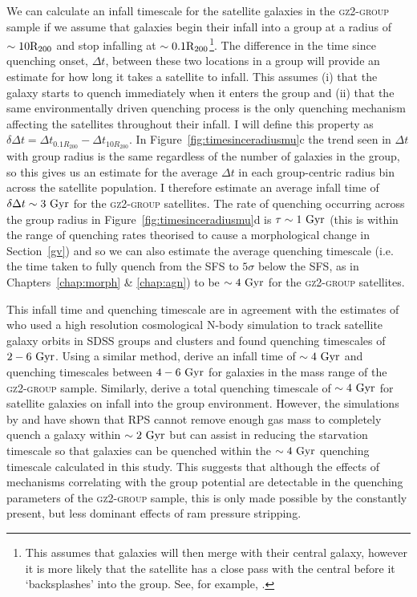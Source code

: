 We can calculate an infall timescale for the satellite galaxies in the \textsc{gz2-group} sample if we assume that galaxies begin their infall into a group at a radius of $\sim10\rm{R}_{200}$ and stop infalling at $\sim0.1\rm{R}_{200}$\footnote{This assumes that galaxies will then merge with their central galaxy, however it is more likely that the satellite has a close pass with the central before it `backsplashes' into the group. See, for example, \cite{pimbblet11}.}. The difference in the time since quenching onset, $\Delta t$, between these two locations in a group will provide an estimate for how long it takes a satellite to infall. This assumes (i) that the galaxy starts to quench immediately when it enters the group and (ii) that the same environmentally driven quenching process is the only quenching mechanism affecting the satellites throughout their infall. I will define this property as $\delta \Delta t = \Delta t_{0.1R_{200}} - \Delta t_{10 R_{200}}$. In Figure~\ref{fig:timesinceradiusmu}c the trend seen in $\Delta t$ with group radius is the same regardless of the number of galaxies in the group, so this gives us an estimate for the average $\Delta t$ in each group-centric radius bin across the satellite population. I therefore estimate an average infall time of $\delta \Delta t \sim 3 ~\rm{Gyr}$ for the \textsc{gz2-group} satellites. The rate of quenching occurring across the group radius in Figure~\ref{fig:timesinceradiusmu}d is $\tau \sim 1~\rm{Gyr}$ (this is within the range of quenching rates theorised to cause a morphological change in Section~\ref{gv}) and so we can also estimate the average quenching timescale (i.e. the time taken to fully quench from the SFS to $5\sigma$ below the SFS, as in Chapters~\ref{chap:morph} \& \ref{chap:agn}) to be $\sim 4~\rm{Gyr}$ for the \textsc{gz2-group} satellites.

This infall time and quenching timescale are in agreement with the estimates of \cite{wetzel13} who used a high resolution cosmological N-body simulation to track satellite galaxy orbits in SDSS groups and clusters and found quenching timescales of $2-6~\rm{Gyr}$. Using a similar method, \cite{oman16} derive an infall time of $\sim4~\rm{Gyr}$ and quenching timescales between $4-6~\rm{Gyr}$ for galaxies in the mass range of the \textsc{gz2-group} sample. Similarly, \cite{hahn16} derive a total quenching timescale of $\sim4~\rm{Gyr}$ for satellite galaxies on infall into the group environment. However, the simulations by \cite{fillingham16} and \cite{emerick16} have shown that RPS cannot remove enough gas mass to completely quench a galaxy within $\sim2~\rm{Gyr}$ but can assist in reducing the starvation timescale so that galaxies can be quenched within the $\sim4~\rm{Gyr}$ quenching timescale calculated in this study. This suggests that although the effects of mechanisms correlating with the group potential are detectable in the quenching parameters of the \textsc{gz2-group} sample, this is only made possible by the constantly present, but less dominant effects of ram pressure stripping. 

